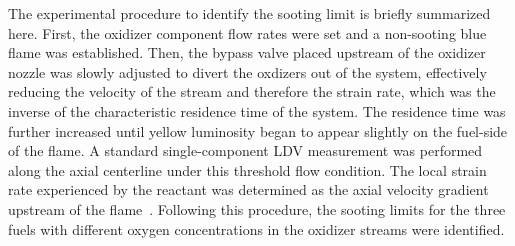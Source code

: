 \documentclass[preprint,3p,times,twocolumn]{elsarticleUS}
\begin{document}


The experimental procedure to identify the sooting limit is briefly summarized here. First, the oxidizer component flow rates were set and a non-sooting blue flame was established. Then, the bypass valve placed upstream of the oxidizer nozzle was slowly adjusted to divert the oxdizers out of the system, effectively reducing the velocity of the stream and therefore the strain rate, which was the inverse of the characteristic residence time of the system. The residence time was further increased until yellow luminosity began to appear slightly on the fuel-side of the flame. A standard single-component LDV measurement was performed along the axial centerline under this threshold flow condition. The local strain rate experienced by the reactant was determined as the axial velocity gradient upstream of the flame~\cite{du89}. Following this procedure, the sooting limits for the three fuels with different oxygen concentrations in the oxidizer streams were identified.
\end{document}
